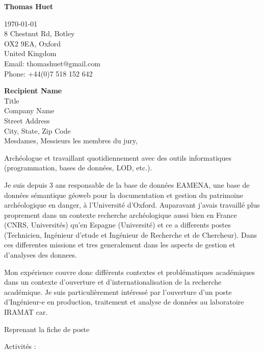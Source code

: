 \documentclass[12pt]{article}
\begin{document}
\begin{center}
    \Large\textbf{Thomas Huet} %
\end{center}

\begin{flushright}
  \today \\[12pt] %
  8 Chestnut Rd, Botley \\
  OX2 9EA, Oxford \\
  United Kingdom\\
  Email: thomashuet@gmail.com \\
  Phone: +44(0)7 518 152 642
\end{flushright}

\textbf{Recipient Name} \\
Title \\
Company Name \\
Street Address \\
City, State, Zip Code \\

Mesdames, Messieurs les membres du jury,

\vspace{12pt} %
Archéologue et travaillant quotidiennement avec des outils informatiques (programmation, bases de données, LOD, etc.). 

Je suis depuis 3 ans responsable de la base de données EAMENA, une base de données sémantique géoweb pour la documentation et gestion du patrimoine archéologique en danger, à l'Université d'Oxford. Auparavant j'avais travaillé plus proprement dans un contexte recherche archéologique aussi bien en France (CNRS, Universités) qu'en Espagne (Université) et ce a differents postes (Technicien, Ingénieur d'etude et Ingénieur de Recherche et de Chercheur). Dans ces differentes missions et tres generalement dans les aspects de gestion et d'analyses des donnees.

Mon expérience couvre donc différents contextes et problématiques académiques dans un contexte d'ouverture et d'internationalisation de la recherche académique. Je suis particulièrement intéressé par l'ouverture d'un poste d'Ingénieur-e en production, traitement et analyse de données au laboratoire IRAMAT car.

Reprenant la fiche de poste

Activités :
 
\end{document}
